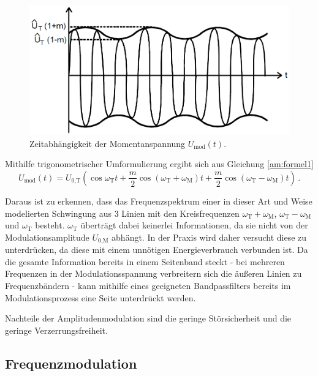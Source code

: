 \begin{figure}[!h]
    \centering
    \includegraphics[width=14cm]{images/am-amplitude.png}
    \caption{Zeitabhängigkeit der Momentanspannung $U_\text{mod}(t)$.}
    \label{am:amplitude}
\end{figure}

Mithilfe trigonometrischer Umformulierung ergibt sich aus Gleichung \eqref{am:formel1} 
\begin{equation}
     U_\text{mod}(t) = U_\text{0,T} \left( \cos{\omega_\text{T} t} + \frac{m}{2}\cos{(\omega_\text{T} + \omega_\text{M}) t} + \frac{m}{2}\cos{(\omega_\text{T} - \omega_\text{M}) t}\right) \,. \label{am:formel2}
\end{equation}

Daraus ist zu erkennen, dass das Frequenzspektrum einer in dieser Art und Weise modelierten Schwingung aus 3 Linien mit den Kreisfrequenzen $\omega_\text{T} + \omega_\text{M}$, $\omega_\text{T} - \omega_\text{M}$ und $\omega_\text{T}$ besteht.
$\omega_\text{T}$ überträgt dabei keinerlei Informationen, da sie nicht von der Modulationsamplitude $U_\text{0,M}$ abhängt.
In der Praxis wird daher versucht diese zu unterdrücken, da diese mit einem unnötigen Energieverbrauch verbunden ist.
Da die gesamte Information bereits in einem Seitenband steckt - bei mehreren Frequenzen in der Modulationsspannung verbreitern sich die äußeren Linien zu Frequenzbändern - kann mithilfe eines geeigneten Bandpassfilters bereits im Modulationsprozess eine Seite unterdrückt werden.

Nachteile der Amplitudenmodulation sind die geringe Störsicherheit und die geringe Verzerrungsfreiheit.

\subsection{Frequenzmodulation}
\label{subsec:einstein}


